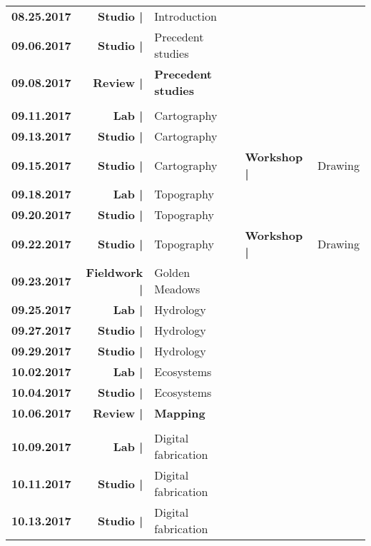 \documentclass[11pt,article,oneside]{memoir}
\begin{document}
\begin{table}[H]
\small
\begin{tabular}{l @{\hskip 0.75cm} r @{\hskip 0.1cm} l @{\hskip 1cm} l @{\hskip 0.1cm} l }
%
\textbf{08.25.2017} & \textbf{Studio |} & Introduction\\
%
\textbf{09.06.2017} & \textbf{Studio |} & Precedent studies\\
\textbf{09.08.2017} & \textbf{Review |} & \textbf{Precedent studies}\\
%
\\
%
%
\textbf{09.11.2017} & \textbf{Lab |} & Cartography\\ %
\textbf{09.13.2017} & \textbf{Studio |} & Cartography\\
\textbf{09.15.2017} & \textbf{Studio |} & Cartography & \textbf{Workshop |} & Drawing\\
%
\textbf{09.18.2017} & \textbf{Lab |} & Topography\\
\textbf{09.20.2017} & \textbf{Studio |} & Topography\\
\textbf{09.22.2017} & \textbf{Studio |} & Topography & \textbf{Workshop |} & Drawing\\
%
\textbf{09.23.2017} & \textbf{Fieldwork |} & Golden Meadows\\
%
\textbf{09.25.2017} & \textbf{Lab |} & Hydrology\\
\textbf{09.27.2017} & \textbf{Studio |} & Hydrology\\
\textbf{09.29.2017} & \textbf{Studio |} & Hydrology\\
%
\textbf{10.02.2017} & \textbf{Lab |} & Ecosystems\\
\textbf{10.04.2017} & \textbf{Studio |} & Ecosystems\\
\textbf{10.06.2017} & \textbf{Review |} & \textbf{Mapping}\\
%
\\
%
\textbf{10.09.2017} & \textbf{Lab |} & Digital fabrication\\
\textbf{10.11.2017} & \textbf{Studio |} & Digital fabrication\\
\textbf{10.13.2017} & \textbf{Studio |} & Digital fabrication\\

\end{tabular}
\end{table}
\end{document}
